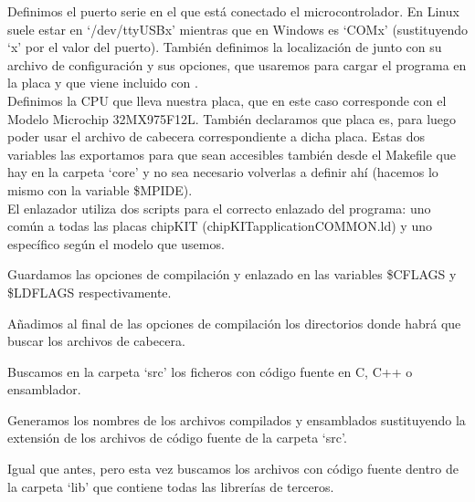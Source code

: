 
Definimos el puerto serie en el que está conectado el microcontrolador. En Linux suele estar en `/dev/ttyUSBx' mientras que en Windows es `COMx' (sustituyendo `x' por el valor del puerto). También definimos la localización de  junto con su archivo de configuración y sus opciones, que usaremos para cargar el programa en la placa y que viene incluido con .\\


Definimos la CPU que lleva nuestra placa, que en este caso corresponde con el Modelo Microchip 32MX975F12L. También declaramos que placa es, para luego poder usar el archivo de cabecera correspondiente a dicha placa. Estas dos variables las exportamos para que sean accesibles también desde el Makefile que hay en la carpeta `core' y no sea necesario volverlas a definir ahí (hacemos lo mismo con la variable \$MPIDE).\\


El enlazador utiliza dos scripts para el correcto enlazado del programa: uno común a todas las placas chipKIT (chipKIT\-application\-COMMON.ld) y uno específico según el modelo que usemos.


Guardamos las opciones de compilación y enlazado en las variables \$CFLAGS y \$LDFLAGS respectivamente.


Añadimos al final de las opciones de compilación los directorios donde habrá que buscar los archivos de cabecera.


Buscamos en la carpeta `src' los ficheros con código fuente en C, C++ o ensamblador.


Generamos los nombres de los archivos compilados y ensamblados sustituyendo la extensión de los archivos de código fuente de la carpeta `src'.


Igual que antes, pero esta vez buscamos los archivos con código fuente dentro de la carpeta `lib' que contiene todas las librerías de terceros.

